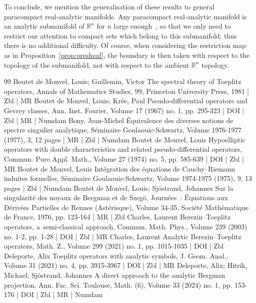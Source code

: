 \documentclass[10pt]{amsart}
\theoremstyle{definition}\newtheorem{defi}[theo]{Definition}\newtheorem{rema}[theo]{Remark}\newtheorem{exam}[theo]{Example}\newtheorem{exem}[theo]{Example}\newtheorem{nota}[theo]{Notation}
\newcommand\1{\mathds{1}}
\newcommand{\R}{\mathbb{R}}
\begin{document}
To conclude, we mention the generalisation of these results to general paracompact real-analytic manifolds. Any paracompact real-analytic manifold is an analytic submanifold of $\R^n$ for $n$ large enough~\cite{grauert_levis_1958}, so that we only need to restrict our attention to compact sets which belong to this submanifold; thus there is no additional difficulty. Of course, when considering the restriction map as in Proposition~\ref{prop:presheaf}, the boundary is then taken with respect to the topology of the submanifold, not with respect to the ambient $\R^n$ topology.




\begin{thebibliography}{99}
Boutet de Monvel, Louis; Guillemin, Victor The spectral theory of Toeplitz operators, Annals of Mathematics Studies, 99, Princeton University Press, 1981 | Zbl | MR
Boutet de Monvel, Louis; Krée, Paul Pseudo-differential operators and Gevrey classes, Ann. Inst. Fourier, Volume 17 (1967) no. 1, pp. 295-323 | DOI | Zbl | MR | Numdam
Bony, Jean-Michel Équivalence des diverses notions de spectre singulier analytique, Séminaire Goulaouic-Schwartz, Volume 1976-1977 (1977), 3, 12 pages | MR | Zbl | Numdam
Boutet de Monvel, Louis Hypoelliptic operators with double characteristics and related pseudo-differential operators, Commun. Pure Appl. Math., Volume 27 (1974) no. 5, pp. 585-639 | DOI | Zbl | MR
Boutet de Monvel, Louis Intégration des équations de Cauchy–Riemann induites formelles, Séminaire Goulaouic-Schwartz, Volume 1974-1975 (1975), 9, 13 pages | Zbl | Numdam
Boutet de Monvel, Louis; Sjöstrand, Johannes Sur la singularité des noyaux de Bergman et de Szegö, Journées : Équations aux Dérivées Partielles de Rennes (Astérisque), Volume 34-35, Société Mathématique de France, 1976, pp. 123-164 | MR | Zbl
Charles, Laurent Berezin–Toeplitz operators, a semi-classical approach, Commun. Math. Phys., Volume 239 (2003) no. 1-2, pp. 1-28 | DOI | Zbl | MR
Charles, Laurent Analytic Berezin–Toeplitz operators, Math. Z., Volume 299 (2021) no. 1, pp. 1015-1035 | DOI | Zbl
Deleporte, Alix Toeplitz operators with analytic symbols, J. Geom. Anal., Volume 31 (2021) no. 4, pp. 3915-3967 | DOI | Zbl | MR
Deleporte, Alix; Hitrik, Michael; Sjöstrand, Johannes A direct approach to the analytic Bergman projection, Ann. Fac. Sci. Toulouse, Math. (6), Volume 33 (2024) no. 1, pp. 153-176 | DOI | Zbl | MR | Numdam

\end{thebibliography}
\end{document}
